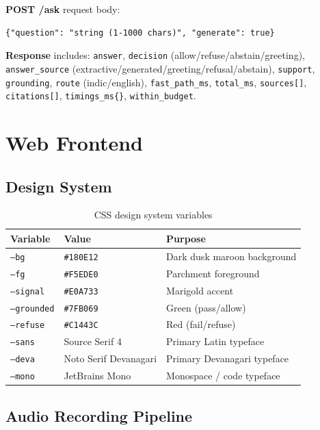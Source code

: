 \documentclass[12pt,a4paper]{article}
\begin{document}
\textbf{POST /ask} request body:
\begin{lstlisting}[language={}]
{"question": "string (1-1000 chars)", "generate": true}
\end{lstlisting}

\textbf{Response} includes: \texttt{answer}, \texttt{decision} (allow/refuse/abstain/greeting), \texttt{answer\_source} (extractive/generated/greeting/refusal/abstain), \texttt{support}, \texttt{grounding}, \texttt{route} (indic/english), \texttt{fast\_path\_ms}, \texttt{total\_ms}, \texttt{sources[]}, \texttt{citations[]}, \texttt{timings\_ms\{\}}, \texttt{within\_budget}.


\section{Web Frontend}

\subsection{Design System}

\begin{table}[H]
\centering
\begin{tabular}{lll}
\toprule
\textbf{Variable} & \textbf{Value} & \textbf{Purpose} \\
\midrule
\texttt{--bg}        & \texttt{\#180E12} & Dark dusk maroon background \\
\texttt{--fg}        & \texttt{\#F5EDE0} & Parchment foreground \\
\texttt{--signal}    & \texttt{\#E0A733} & Marigold accent \\
\texttt{--grounded}  & \texttt{\#7FB069} & Green (pass/allow) \\
\texttt{--refuse}    & \texttt{\#C1443C} & Red (fail/refuse) \\
\texttt{--sans}      & Source Serif 4    & Primary Latin typeface \\
\texttt{--deva}      & Noto Serif Devanagari & Primary Devanagari typeface \\
\texttt{--mono}      & JetBrains Mono    & Monospace / code typeface \\
\bottomrule
\end{tabular}
\caption{CSS design system variables}
\end{table}

\subsection{Audio Recording Pipeline}
\end{document}
